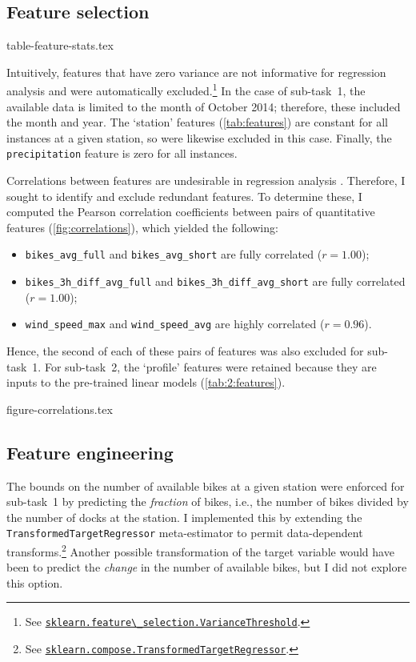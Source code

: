 \documentclass[11pt]{extarticle}
\newcommand{\windspeedmax}{\texttt{wind\_speed\_max}}
\newcommand{\windspeedavg}{\texttt{wind\_speed\_avg}}
\newcommand{\bikesavgfull}{\texttt{bikes\_avg\_full}}
\newcommand{\bikesavgshort}{\texttt{bikes\_avg\_short}}
\newcommand{\bikeshdiffavgfull}{\texttt{bikes\_3h\_diff\_avg\_full}}
\newcommand{\bikeshdiffavgshort}{\texttt{bikes\_3h\_diff\_avg\_short}}
\newcommand{\sklearn}[2]{\href{https://scikit-learn.org/stable/modules/generated/sklearn.#1.#2.html}{\lstinline|sklearn.#1.#2|}}
\begin{document}
\subsection{Feature selection}
\label{sec:feature-selection}

{table-feature-stats.tex}

Intuitively, features that have zero variance are not informative for regression
analysis and were automatically excluded.\footnote{See
  \sklearn{feature\_selection}{VarianceThreshold}.
}
In the case of sub-task~1, the available data is limited to the month of October 2014;
therefore, these included the month and year.
The `station' features (\cref{tab:features}) are constant for all instances at a given
station, so were likewise excluded in this case.
Finally, the \texttt{precipitation} feature is zero for all instances.

Correlations between features are undesirable in regression analysis
\parencite{Alin2010}.
Therefore, I sought to identify and exclude redundant features.
To determine these, I computed the Pearson correlation coefficients between pairs of
quantitative features (\cref{fig:correlations}), which yielded the following:
\begin{itemize}
  \item \texttt{\bikesavgfull} and \texttt{\bikesavgshort} are fully correlated ($r = 1.00$);
  \item \texttt{\bikeshdiffavgfull} and \texttt{\bikeshdiffavgshort} are fully correlated ($r  = 1.00$);
  \item \texttt{\windspeedmax} and \texttt{\windspeedavg} are highly correlated ($r = 0.96$).
\end{itemize}
Hence, the second of each of these pairs of features was also excluded for sub-task~1.
For sub-task~2, the `profile' features were retained because they are inputs to the
pre-trained linear models (\cref{tab:2:features}).

{figure-correlations.tex}

\subsection{Feature engineering}
\label{sec:feature-engineering}

The bounds on the number of available bikes at a given station were enforced for
sub-task~1 by predicting the \emph{fraction} of bikes, i.e., the number of bikes
divided by the number of docks at the station.
I implemented this by extending the \texttt{TransformedTargetRegressor} meta-estimator
to permit data-dependent transforms.\footnote{See
  \sklearn{compose}{TransformedTargetRegressor}.
}
Another possible transformation of the target variable would have been to predict the
\emph{change} in the number of available bikes, but I did not explore this option.
\end{document}
